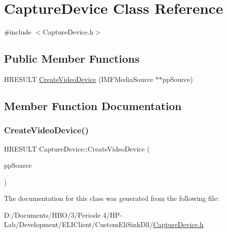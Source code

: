 \hypertarget{class_capture_device}{}\section{Capture\+Device Class Reference}
\label{class_capture_device}


{\ttfamily \#include $<$Capture\+Device.\+h$>$}

\subsection*{Public Member Functions}
\begin{DoxyCompactItemize}
\item 
H\+R\+E\+S\+U\+LT \hyperlink{class_capture_device_a7ebedfe8dfaa9f563a17cc06eb478e8d}{Create\+Video\+Device} (I\+M\+F\+Media\+Source $\ast$$\ast$pp\+Source)
\end{DoxyCompactItemize}


\subsection{Member Function Documentation}
\mbox{\label{class_capture_device_a7ebedfe8dfaa9f563a17cc06eb478e8d}} 
\subsubsection{\texorpdfstring{Create\+Video\+Device()}{CreateVideoDevice()}}
{\footnotesize\ttfamily H\+R\+E\+S\+U\+LT Capture\+Device\+::\+Create\+Video\+Device (\begin{DoxyParamCaption}\item[{I\+M\+F\+Media\+Source $\ast$$\ast$}]{pp\+Source }\end{DoxyParamCaption})}



The documentation for this class was generated from the following file\+:\begin{DoxyCompactItemize}
\item 
D\+:/\+Documents/\+H\+B\+O/3/\+Periode 4/\+H\+P-\/\+Lab/\+Development/\+E\+L\+I\+Client/\+Custom\+Eli\+Sink\+Dll/\hyperlink{_capture_device_8h}{Capture\+Device.\+h}\end{DoxyCompactItemize}
